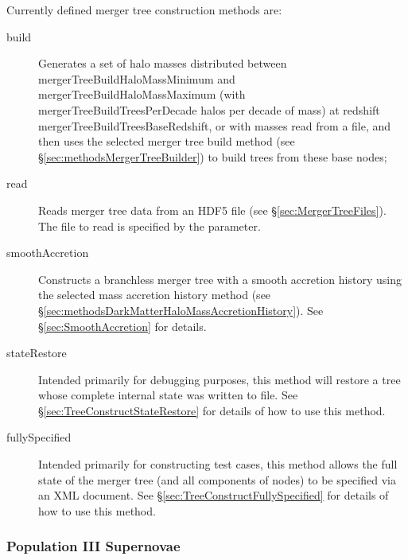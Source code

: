 Currently defined merger tree construction methods are:
\begin{description}
 \item [{\normalfont \ttfamily build}] Generates a set of halo masses distributed between {\normalfont \ttfamily mergerTreeBuildHaloMassMinimum} and {\normalfont \ttfamily mergerTreeBuildHaloMassMaximum} (with {\normalfont \ttfamily mergerTreeBuildTreesPerDecade} halos per decade of mass) at redshift {\normalfont \ttfamily mergerTreeBuildTreesBaseRedshift}, or with masses read from a file, and then uses the selected merger tree build method (see \S\ref{sec:methodsMergerTreeBuilder}) to build trees from these base nodes;
 \item [{\normalfont \ttfamily read}] Reads merger tree data from an HDF5 file (see \S\ref{sec:MergerTreeFiles}). The file to read is specified by the {\normalfont \ttfamily [mergerTreeReadFileName]} parameter.
 \item [{\normalfont \ttfamily smoothAccretion}] Constructs a branchless merger tree with a smooth accretion history using the selected mass accretion history method (see \S\ref{sec:methodsDarkMatterHaloMassAccretionHistory}). See \S\ref{sec:SmoothAccretion} for details.
 \item [{\normalfont \ttfamily stateRestore}] Intended primarily for debugging purposes, this method will restore a tree whose complete internal state was written to file. See \S\ref{sec:TreeConstructStateRestore} for details of how to use this method.
 \item [{\normalfont \ttfamily fullySpecified}] Intended primarily for constructing test cases, this method allows the full state of the merger tree (and all components of nodes) to be specified via an XML document. See \S\ref{sec:TreeConstructFullySpecified} for details of how to use this method.
\end{description}

\subsubsection{Population III Supernovae}

